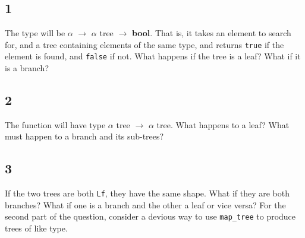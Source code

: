 \documentclass[]{book}
\newcommand{\smspace}{\vspace{4mm}}
\begin{document}
\begin{multicols*}{2}





\section*{\\ }

\subsection*{1}
The type will be \textsf{$\alpha$ $\rightarrow$ $\alpha$ tree $\rightarrow$ \textbf{bool}}. That is, it takes an element to search for, and a tree containing elements of the same type, and returns \texttt{true} if the element is found, and \texttt{false} if not. What happens if the tree is a leaf? What if it is a branch?

\subsection*{2}
The function will have type \textsf{$\alpha$  tree $\rightarrow$ $\alpha$ tree}. What happens to a leaf? What must happen to a branch and its sub-trees?

\subsection*{3}
If the two trees are both \texttt{Lf}, they have the same shape. What if they are both branches? What if one is a branch and the other a leaf or vice versa? For the second part of the question, consider a devious way to use \texttt{map\_tree} to produce trees of like type.


\end{multicols*}
\end{document}
